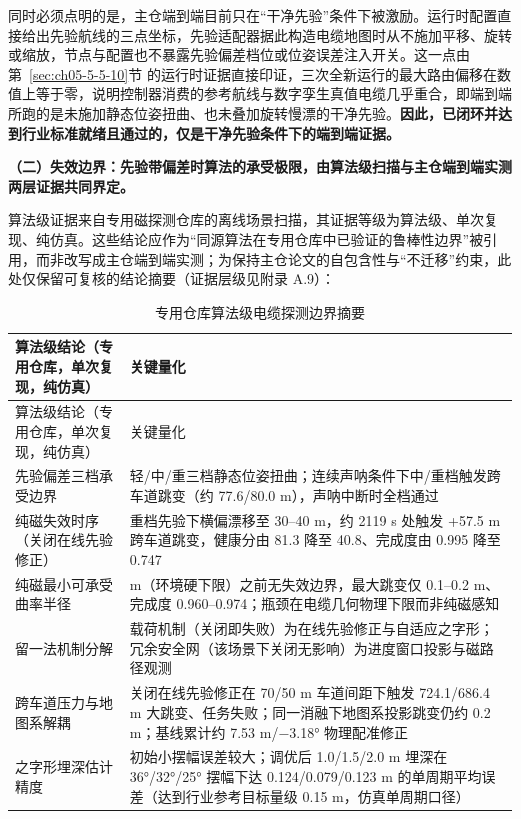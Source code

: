 同时必须点明的是，主仓端到端目前只在``干净先验''条件下被激励。运行时配置直接给出先验航线的三点坐标，先验适配器据此构造电缆地图时从不施加平移、旋转或缩放，节点与配置也不暴露先验偏差档位或位姿误差注入开关。这一点由第~\ref{sec:ch05-5-5-10}节 的运行时证据直接印证，三次全新运行的最大路由偏移在数值上等于零，说明控制器消费的参考航线与数字孪生真值电缆几乎重合，即端到端所跑的是未施加静态位姿扭曲、也未叠加旋转慢漂的干净先验。\textbf{因此，已闭环并达到行业标准就绪且通过的，仅是干净先验条件下的端到端证据。}

\textbf{（二）失效边界：先验带偏差时算法的承受极限，由算法级扫描与主仓端到端实测两层证据共同界定。}

算法级证据来自专用磁探测仓库的离线场景扫描，其证据等级为算法级、单次复现、纯仿真。这些结论应作为``同源算法在专用仓库中已验证的鲁棒性边界''被引用，而非改写成主仓端到端实测；为保持主仓论文的自包含性与``不迁移''约束，此处仅保留可复核的结论摘要（证据层级见附录 A.9）：

\begin{longtable}[]{@{}
  >{\raggedright\arraybackslash}p{}
  >{\raggedright\arraybackslash}p{}@{}}
\caption{专用仓库算法级电缆探测边界摘要}\label{tab:ch05-cable-algorithm-boundaries}\tabularnewline
\toprule\noalign{}
算法级结论（专用仓库，单次复现，纯仿真） & 关键量化 \\
\midrule\noalign{}
\endfirsthead
\toprule\noalign{}
算法级结论（专用仓库，单次复现，纯仿真） & 关键量化 \\
\midrule\noalign{}
\endhead
\bottomrule\noalign{}
\endlastfoot
先验偏差三档承受边界 & 轻/中/重三档静态位姿扭曲；连续声呐条件下中/重档触发跨车道跳变（约 77.6/80.0 m），声呐中断时全档通过 \\
纯磁失效时序（关闭在线先验修正） & 重档先验下横偏漂移至 30--40 m，约 2119 s 处触发 +57.5 m 跨车道跳变，健康分由 81.3 降至 40.8、完成度由 0.995 降至 0.747 \\
纯磁最小可承受曲率半径 & 30 m（环境硬下限）之前无失效边界，最大跳变仅 0.1--0.2 m、完成度 0.960--0.974；瓶颈在电缆几何物理下限而非纯磁感知 \\
留一法机制分解 & 载荷机制（关闭即失败）为在线先验修正与自适应之字形；冗余安全网（该场景下关闭无影响）为进度窗口投影与磁路径观测 \\
跨车道压力与地图系解耦 & 关闭在线先验修正在 70/50 m 车道间距下触发 724.1/686.4 m 大跳变、任务失败；同一消融下地图系投影跳变仍约 0.2 m；基线累计约 7.53 m/−3.18° 物理配准修正 \\
之字形埋深估计精度 & 初始小摆幅误差较大；调优后 1.0/1.5/2.0 m 埋深在 36°/32°/25° 摆幅下达 0.124/0.079/0.123 m 的单周期平均误差（达到行业参考目标量级 0.15 m，仿真单周期口径） \\
\end{longtable}

